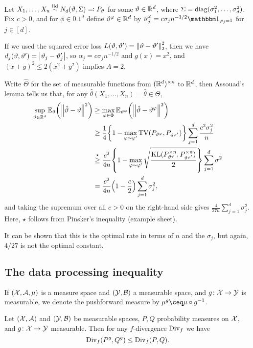 \begin{example}
	Let $X_1, \dotsc, X_n \overset{\mathrm{iid}}{\sim} N_d(\vartheta, \Sigma) \eqqcolon P_\vartheta$ for some $\vartheta \in \mathbb R^d$, where $\Sigma = \mathrm{diag}(\sigma_1^2, \dotsc, \sigma_d^2)$. Fix $c > 0$, and for $\phi \in \qty{0, 1}^d$ define $\vartheta^\varphi \in \mathbb R^d$ by $\theta_j^\phi = c\sigma_j n^{-1/2} \ind_{\phi_j = 1}$ for $j \in [d]$. 
	
	If we used the squared error loss $L(\vartheta, \vartheta') = \norm{\vartheta - \vartheta'}_2^2$, then we have $d_j(\vartheta, \vartheta') = \abs{\vartheta_j - \vartheta'_j}$, so $\alpha_j = c \sigma_j n^{-1/2}$ and $g(x) = x^2$, and  $(x+y)^2 \leq 2(x^2 + y^2)$ implies $A = 2$. 
	
	Write $\hat\Theta$ for the set of measurable functions from $(\mathbb R^d)^{\times n}$ to $\mathbb R^d$, then Assouad's lemma tells us that, for any $\hat\theta(X_1, \dotsc, X_n) = \hat\theta \in \Theta$, 
	\begin{align*}
		\sup_{\vartheta \in \mathbb R^d} \mathbb E_\vartheta \qty(\norm{\hat{\vartheta} - \vartheta}^2) &\geq \max_{\varphi \in \Phi} \mathbb E_{\vartheta^\varphi} \qty(\norm{\hat{\vartheta} - \vartheta^\varphi}^2) \\
		&\geq \frac14 \qty{1 - \max_{\varphi\sim \varphi'} \operatorname{TV}(P_{\vartheta^\varphi}, P_{\vartheta^{\varphi'}})} \sum_{j=1}^d \frac{c^2\sigma_j^2}{n} \\
		&\overset\star\geq \frac{c^2}{4n} \qty{1 - \max_{\varphi\sim \varphi'} \sqrt{\frac{\operatorname{KL}(P_{\vartheta^\varphi}^{\times n}, P_{\vartheta^{\varphi'}}^{\times n})}{2}}} \sum_{j=1}^d \sigma^2 \\
		&= \frac{c^2}{4n} \qty(1 - \frac c2) \sum_{j=1}^d \sigma_j^2, 
	\end{align*}
and taking the supremum over all $c > 0$ on the right-hand side gives $\frac4{27n} \sum_{j=1}^d \sigma_j^2$.  Here, $\star$ follows from Pinsker's inequality (example sheet). 

It can be shown that this is the optimal rate in terms of $n$ and the $\sigma_j$, but again, $4/27$ is not the optimal constant. 

\subsection{The data processing inequality}
If $(\mathcal X, \mathcal A, \mu)$ is a measure space and $(\mathcal Y, \mathcal B)$ a measurable space, and $g \colon \mathcal X \to \mathcal Y$ is measurable, we denote the pushforward measure by $\mu^g \ceq \mu \circ g^{-1}$. 
\begin{lemma}
	Let $(\mathcal X, \mathcal A)$ and $(\mathcal Y, \mathcal B)$ be measurable spaces, $P, Q$ probability measures on $\mathcal X$, and $g \colon \mathcal X \to \mathcal Y$ measurable. Then for any $f$-divergence $\operatorname{Div}_f$ we have
	\[
	\operatorname{Div}_f (P^g, Q^g) \leq \operatorname{Div}_f(P, Q). 
	\]
\end{lemma}


\end{example}
